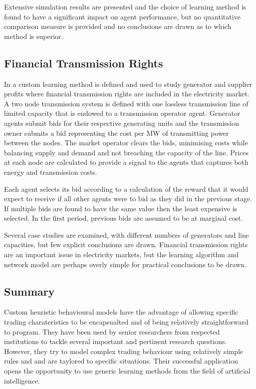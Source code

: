 Extensive simulation results are presented and the choice of learning method is
found to have a significant impact on agent performance, but no quantitative
comparison measure is provided and no conclusions are drawn as to which method
is superior.

\subsection{Financial Transmission Rights}
In  a custom learning method is defined and used to study
generator and supplier profits where financial transmission rights are included
in the electricity market.  A two node transmission system is defined with one
lossless transmission line of limited capacity that is endowed to a transmission
operator agent.  Generator agents submit bids for their respective generating
units and the transmission owner submits a bid representing the cost per MW of
transmitting power between the nodes.  The market operator clears the bids,
minimising costs while balancing supply and demand and not breaching the
capacity of the line.  Prices at each node are calculated to provide a signal to
the agents that captures both energy and transmission costs.


Each agent selects its bid according to a calculation of the reward that it
would expect to receive if all other agents were to bid as they did in the
previous stage.  If multiple bids are found to have the same value then the
least expensive is selected.  In the first period, previous bids are assumed to
be at marginal cost.

Several case studies are examined, with different numbers of generators and
line capacities, but few explicit conclusions are drawn.  Financial transmission
rights are an important issue in electricity markets, but the learning algorithm
and network model are perhaps overly simple for practical conclusions to be
drawn.

\subsection{Summary}
Custom heuristic behavioural models have the advantage of allowing specific
trading charateristics to be encapsualted and of being relatively
straightforward to program. They have been used by senior researchers from
respected institutions to tackle several important and pertinent research
questions. However, they try to model complex trading behaviour using relatively simple
rules and and are taylored to specific situations. Their successful application
opens the opportunity to use generic learning methods from the field of
artificial intelligence.

